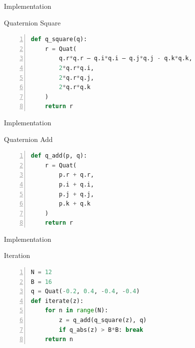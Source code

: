 \documentclass[aspectratio=169,t]{beamer}
\begin{document}
\begin{frame}[label={sec:org240927a},fragile]{Implementation}
 \begin{block}{Quaternion Square}
\begin{lstlisting}[language=Python,firstnumber=1,numbers=left]
def q_square(q):
    r = Quat(
        q.r*q.r – q.i*q.i – q.j*q.j - q.k*q.k,
        2*q.r*q.i,
        2*q.r*q.j,
        2*q.r*q.k
    )
    return r
\end{lstlisting}
\end{block}
\end{frame}

\begin{frame}[label={sec:org97a9868},fragile]{Implementation}
 \begin{block}{Quaternion Add}
\begin{lstlisting}[language=Python,firstnumber=1,numbers=left]
def q_add(p, q):
    r = Quat(
        p.r + q.r,
        p.i + q.i,
        p.j + q.j,
        p.k + q.k
    )
    return r
\end{lstlisting}
\end{block}
\end{frame}

\begin{frame}[label={sec:org66ccd12},fragile]{Implementation}
 \begin{block}{Iteration}
\begin{lstlisting}[language=Python,firstnumber=1,numbers=left]
N = 12
B = 16
q = Quat(-0.2, 0.4, -0.4, -0.4)
def iterate(z):
    for n in range(N):
        z = q_add(q_square(z), q)
        if q_abs(z) > B*B: break
    return n
\end{lstlisting}
\end{block}
\end{frame}
\end{document}
